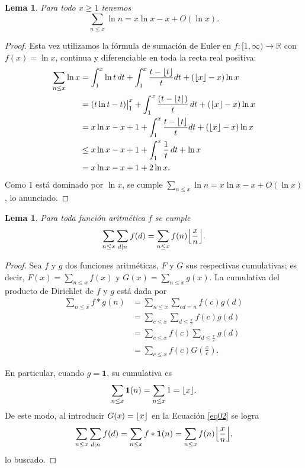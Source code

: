 \documentclass[10pt]{article}
\DeclarePairedDelimiter\floor{\lfloor}{\rfloor}
\newtheorem{lemma}[theorem]{Lema}
\theoremstyle{definition}
\theoremstyle{remark}
\newcommand{\BR}{\mathbb R}
\begin{document}
\begin{lemma}\label{lem09}
Para todo $x \geq 1$ tenemos
\[
\sum_{n \leq x} \ln n = x\ln x - x + O(\ln x).
\]
\end{lemma}

\begin{proof}
Esta vez utilizamos la f\'ormula de sumaci\'on de Euler en $f : [1, \infty) \to \BR$ con $f(x) = \ln x$, continua y diferenciable en toda la recta real positiva:  
\begin{align}
\sum_{n \leq x} \ln x &= \int_1^x \ln t \, dt + \int_1^x  \frac{t - \floor{t}}{t} dt + (\floor{x} - x) \ln x  \\
&= (t \ln t - t) \big|_1^x + \int_1^x \frac{(t - \floor{t})}{t} \, dt + (\floor{x} - x) \ln x \\
&= x \ln x - x + 1 + \int_1^x \frac{t - \floor{t}}{t} dt + (\floor{x} - x) \ln x \\
&\leq x \ln x - x + 1 + \int_1^x \frac{1}{t} \,dt + \ln x \\
&= x \ln x - x + 1 + 2 \ln x.
\end{align}
Como $1$ est\'a dominado por $\ln x$,  
se cumple $\sum_{n \leq x} \ln n = x\ln x - x + O(\ln x)$, 
lo anunciado. 
\end{proof}

\begin{lemma}\label{lem10}
Para toda funci\'on aritm\'etica $f$ se cumple
\[
\sum_{n \leq x} \sum_{d \mid n} f(d) = \sum_{n \leq x} f(n) \floor*{\frac{x}{n}}.
\]
\end{lemma}

\begin{proof}
Sea $f$ y $g$ dos funciones aritm\'eticas, $F$ y $G$ sus respectivas cumulativas;
es decir, $F(x) = \sum_{n \leq x} f(x)$ y $G(x) = \sum_{n \leq x} g(x)$. 
La cumulativa del producto de Dirichlet de $f$ y $g$ est\'a dada por 
\begin{align}
\sum_{n \leq x} f * g (n) &= \sum_{n \leq x} \sum_{cd = n} f(c)g(d)\\
&= \sum_{c \leq x} \sum_{d \leq \frac{x}{c}} f(c) g(d)\\
&= \sum_{c \leq x} f(c) \sum_{d \leq \frac{x}{c}} g(d)\\
&= \sum_{c \leq x} f(c) G\left(\frac{x}{c}\right).\label{eq02}
\end{align}

En particular, cuando $g = \mathbf{1}$, su cumulativa es
\begin{align}
\sum_{n \leq x} \mathbf{1}(n) = \sum_{n \leq x} 1 = \floor{x}.
\end{align}
De este modo, al introducir $G(x)=\floor{x}$ en la Ecuaci\'on \ref{eq02} se logra 
\begin{align}
\sum_{n \leq x} \sum_{d \mid n} f(d) = \sum_{n \leq x} f * \mathbf{1} (n) = \sum_{n \leq x} f(n) \floor*{\frac{x}{n}}, 
\end{align}
lo buscado. 
\end{proof}
\end{document}
